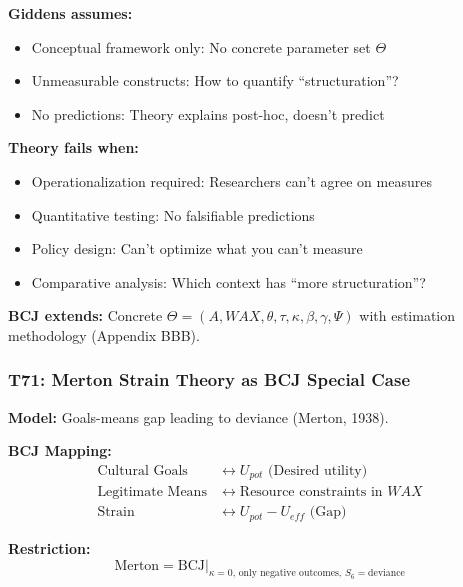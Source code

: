 \begin{tcolorbox}[colback=red!5!white, colframe=red!75!black,
    title=Boundary Condition: Where Giddens Fails]
\textbf{Giddens assumes:}
\begin{itemize}[nosep]
\item Conceptual framework only: No concrete parameter set $\Theta$
\item Unmeasurable constructs: How to quantify ``structuration''?
\item No predictions: Theory explains post-hoc, doesn't predict
\end{itemize}

\textbf{Theory fails when:}
\begin{itemize}[nosep]
\item Operationalization required: Researchers can't agree on measures
\item Quantitative testing: No falsifiable predictions
\item Policy design: Can't optimize what you can't measure
\item Comparative analysis: Which context has ``more structuration''?
\end{itemize}

\textbf{BCJ extends:} Concrete $\Theta = (A, WAX, \theta, \tau, \kappa, \beta, \gamma, \Psi)$ with estimation methodology (Appendix BBB).
\end{tcolorbox}

\subsubsection*{T71: Merton Strain Theory as BCJ Special Case}

\textbf{Model:} Goals-means gap leading to deviance (Merton, 1938).

\textbf{BCJ Mapping:}
\begin{align}
\text{Cultural Goals} &\leftrightarrow U_{pot} \text{ (Desired utility)} \\
\text{Legitimate Means} &\leftrightarrow \text{Resource constraints in } WAX \\
\text{Strain} &\leftrightarrow U_{pot} - U_{eff} \text{ (Gap)}
\end{align}

\textbf{Restriction:}
\begin{equation}
\text{Merton} = \text{BCJ} \big|_{\kappa = 0, \, \text{only negative outcomes}, \, S_6 = \text{deviance}}
\end{equation}

